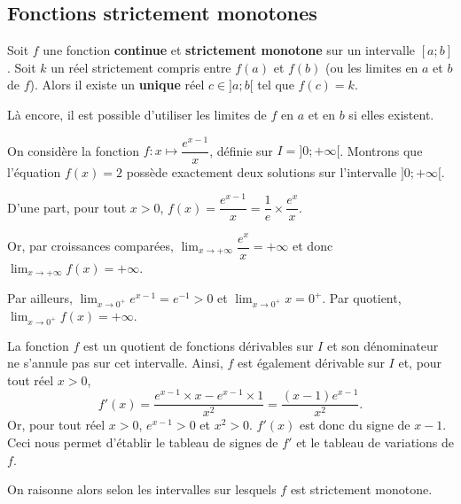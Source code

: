 \documentclass[11pt,fleqn, openany]{book} %
\begin{document}
\subsection{Fonctions strictement monotones}

\begin{theorem} Soit $f$ une fonction \textbf{continue} et \textbf{strictement monotone} sur un intervalle $[a;b]$ . Soit $k$ un réel strictement compris entre $f(a)$ et $f(b)$ (ou les limites en $a$ et $b$ de $f$). Alors il existe un \textbf{unique} réel $c \in ]a;b[$ tel que $f(c)=k$.\end{theorem}

Là encore, il est possible d'utiliser les limites de $f$ en $a$ et en $b$ si elles existent.

\begin{example} On considère la fonction $f:x\mapsto \dfrac{e^{x-1}}{x}$, définie sur $I=]0;+\infty[$.
Montrons que l'équation $f(x)=2$ possède exactement deux solutions sur l'intervalle $]0;+\infty[$.

D'une part, pour tout $x>0$, $f(x)=\dfrac{e^{x-1}}{x}=\dfrac{1}{e}\times \dfrac{e^x}{x}$. 

Or, par croissances comparées, $\displaystyle\lim_{x \to+\infty}\dfrac{e^x}{x}=+\infty$ et donc $\displaystyle\lim_{x\to+\infty}f(x)=+\infty$. 

Par ailleurs, $\displaystyle\lim_{x\to 0^+}e^{x-1}=e^{-1}>0$ et $\displaystyle\lim_{x \to 0^+}x=0^+$. Par quotient, $\displaystyle\lim_{x \to 0^+}f(x)=+\infty$.

La fonction $f$ est un quotient de fonctions dérivables sur $I$ et son dénominateur ne s'annule pas sur cet intervalle. Ainsi, $f$ est également dérivable sur $I$ et, pour tout réel $x>0$,
\[f'(x)=\dfrac{e^{x-1}\times x - e^{x-1} \times 1}{x^2}=\dfrac{(x-1)e^{x-1}}{x^2}.\]
Or, pour tout réel $x>0$, $e^{x-1}>0$ et $x^2>0$. $f'(x)$ est donc du signe de $x-1$. Ceci nous permet d'établir le tableau de signes de $f'$ et le tableau de variations de $f$.

\begin{center}
 \end{center}
 On raisonne alors selon les intervalles sur lesquels $f$ est strictement monotone.
 

\end{example}
\end{document}
